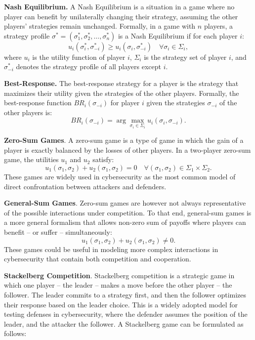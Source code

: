 \textbf{Nash Equilibrium.} A Nash Equilibrium is a situation in a game where no player can benefit by unilaterally changing their strategy, assuming the other players' strategies remain unchanged.
Formally, in a game with $n$ players, a strategy profile $\sigma^* = (\sigma_1^*, \sigma_2^*, \ldots, \sigma_n^*)$ is a Nash Equilibrium if for each player $i$:
\[
u_i(\sigma_i^*, \sigma_{-i}^*) \geq u_i(\sigma_i, \sigma_{-i}^*) \quad \forall \sigma_i \in \Sigma_i,
\]
where $u_i$ is the utility function of player $i$, $\Sigma_i$ is the strategy set of player $i$, and $\sigma_{-i}^*$ denotes the strategy profile of all players except $i$.

\textbf{Best-Response.} The best-response strategy for a player is the strategy that maximizes their utility given the strategies of the other players.
Formally, the best-response function $BR_i(\sigma_{-i})$ for player $i$ given the strategies $\sigma_{-i}$ of the other players is:
\[
BR_i(\sigma_{-i}) = \arg\max_{\sigma_i \in \Sigma_i} u_i(\sigma_i, \sigma_{-i}).
\]

\textbf{Zero-Sum Games}. A zero-sum game is a type of game in which the gain of a player is exactly balanced by the losses of other players.
In a two-player zero-sum game, the utilities $u_1$ and $u_2$ satisfy:
\[
u_1(\sigma_1, \sigma_2) + u_2(\sigma_1, \sigma_2) = 0 \quad \forall (\sigma_1, \sigma_2) \in \Sigma_1 \times \Sigma_2.
\]
These games are widely used in cybersecurity as the most common model of direct confrontation between attackers and defenders.

\textbf{General-Sum Games}. Zero-sum games are however not always representative of the possible interactions under competition.
To that end, general-sum games is a more general formalism that allows non-zero sum of payoffs where players can benefit -- or suffer -- simultaneously:
\[
u_1(\sigma_1, \sigma_2) + u_2(\sigma_1, \sigma_2) \neq 0.
\]
These games could be useful in modeling more complex interactions in cybersecurity that contain both competition and cooperation.

\textbf{Stackelberg Competition}. Stackelberg competition is a strategic game in which one player -- the leader -- makes a move before the other player -- the follower.
The leader commits to a strategy first, and then the follower optimizes their response based on the leader choice.
This is a widely adopted model for testing defenses in cybersecurity, where the defender assumes the position of the leader, and the attacker the follower.
A Stackelberg game can be formulated as follows:


